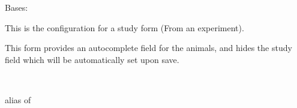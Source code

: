 \documentclass[letterpaper,10pt,english]{sphinxmanual}
\begin{document}
\begin{fulllineitems}
\label{api:data.forms.StudyExperimentForm}
Bases: 

This is the configuration for a study form (From an experiment).

This form provides an autocomplete field for the animals, and hides the study field which will be automatically set upon save.

\begin{fulllineitems}
\label{api:data.forms.StudyExperimentForm.Media}
\end{fulllineitems}


\begin{fulllineitems}
\label{api:data.forms.StudyExperimentForm.Meta}~

\begin{fulllineitems}
\label{api:data.forms.StudyExperimentForm.Meta.model}
alias of 

\end{fulllineitems}


\end{fulllineitems}


\begin{fulllineitems}
\label{api:data.forms.StudyExperimentForm.media}
\end{fulllineitems}


\end{fulllineitems}

\end{document}

